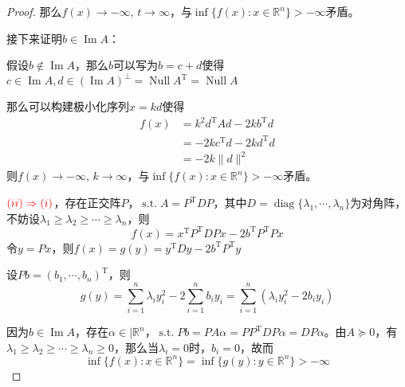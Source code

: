 \begin{problemset}
\begin{proof}
        那么$f(x)\rightarrow -\infty,\, t\rightarrow \infty$，与$\inf \{f(x):x\in\mathbb{R}^{n}\}> -\infty$矛盾。

        接下来证明$b\in \operatorname{Im}A$：

        假设$b\notin \operatorname{Im}A$，那么$b$可以写为$b = c+d$使得$c\in\operatorname{Im}A,d\in (\operatorname*{Im}A)^{\bot}=\operatorname*{Null}A^{\mathrm{T}}=\operatorname*{Null}A$

        那么可以构建极小化序列$x = kd$使得
        \[
            \begin{array}{ll}
                f(x) &= k^2d^{\mathrm{T}}Ad - 2kb^{\mathrm{T}}d\\
                &=- 2kc^{\mathrm{T}}d - 2kd^{\mathrm{T}}d\\
                &=- 2k\|d\|^2
            \end{array}
        \]
        则$f(x)\rightarrow -\infty,\, k\rightarrow \infty$，与$\inf \{f(x):x\in\mathbb{R}^{n}\}> -\infty$矛盾。


        $\color{red}{(ii)\Rightarrow (i)}$，存在正交阵$P$，$\operatorname{s.t.} A = P^{\mathrm{T}}DP$，其中$D = \operatorname{diag}\{\lambda_1,\cdots,\lambda_n\}$为对角阵，不妨设$\lambda_1\geq\lambda_2\geq\cdots\geq\lambda_n$，则
        \[
            f(x) = x^\mathrm{T}P^{\mathrm{T}}DPx-2b^{\mathrm{T}}P^{\mathrm{T}}Px
        \]
        令$y = Px$，则$f(x) = g(y) = y^{\mathrm{T}}Dy-2b^{\mathrm{T}}P^{\mathrm{T}}y$
        
        设$Pb = (b_1,\cdots,b_n)^{\mathrm{T}}$，则
        \[
            g(y) = \sum\limits_{i = 1}^{n}\lambda_iy_i^2-2\sum\limits_{i= 1}^{n}b_iy_i = \sum\limits_{i = 1}^{n}(\lambda_iy_i^2-2b_iy_i)
        \]

        因为$b\in\operatorname{Im}A$，存在$\alpha\in|\mathbb{R}^n$，$\operatorname{s.t.} Pb = PA\alpha = PP^{\mathrm{T}}DP\alpha = DP\alpha$。由$A\succeq 0$，有$\lambda_1\geq\lambda_2\geq\cdots\geq\lambda_n\geq 0$，那么当$\lambda_i = 0$时，$b_{i} = 0$，故而
        \[
            \inf\{f(x):x\in \mathbb{R}^n\}=\inf\{g(y):y\in \mathbb{R}^n\}>-\infty
        \]


\end{proof}
\end{problemset}
